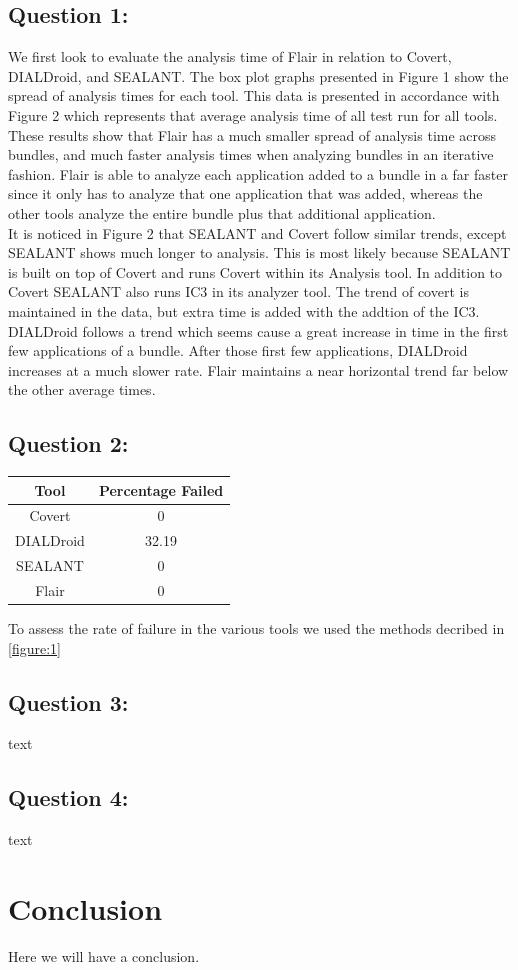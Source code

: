 \documentclass[twocolumn]{article}
\begin{document}
	\subsection{Question 1:}
		We first look to evaluate the analysis time of Flair in relation to Covert, DIALDroid, and SEALANT. The box plot graphs presented in Figure 1 show the spread of analysis times for each tool. This data is presented in accordance with Figure 2 which represents that average analysis time of all test run for all tools. These results show that Flair has a much smaller spread of analysis time across bundles, and much faster analysis times when analyzing bundles in an iterative fashion. Flair is able to analyze each application added to a bundle in a far faster since it only has to analyze that one application that was added, whereas the other tools analyze the entire bundle plus that additional application.\\
		It is noticed in Figure 2 that SEALANT and Covert follow similar trends, except SEALANT shows much longer to analysis. This is most likely because SEALANT is built on top of Covert and runs Covert within its Analysis tool. In addition to Covert SEALANT also runs IC3 in its analyzer tool. The trend of covert is maintained in the data, but extra time is added with the addtion of the IC3. DIALDroid follows a trend which seems cause a great increase in time in the first few applications of a bundle. After those first few applications, DIALDroid increases at a much slower rate. Flair maintains a near horizontal trend far below the other average times.
		
	\subsection{Question 2:}
	
		\begin{table}[h]
		\begin{center}
			\begin{tabular}{ |c c| }
				\hline
				Tool & Percentage Failed\\
				\hline
				Covert & 0\\
				DIALDroid & 32.19\\
				SEALANT & 0\\
				Flair & 0\\
				\hline
			\end{tabular}		
			\end{center}
		\end{table}
		
		To assess the rate of failure in the various tools we used the methods decribed in \ref{figure:1} 
		
	\subsection{Question 3:}
		text
	\subsection{Question 4:}
		text


\section[3]{Conclusion}
Here we will have a conclusion.
\end{document}

